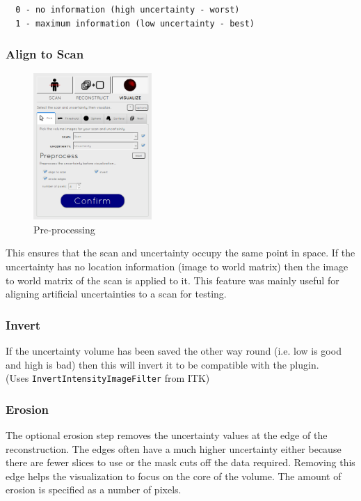 \begin{verbatim}
  0 - no information (high uncertainty - worst)
  1 - maximum information (low uncertainty - best)
\end{verbatim}

\subsubsection*{Align to Scan}
\begin{figure}
  \vspace{-20pt}
  \includegraphics[width=0.4\textwidth]{images/pre-processing.png}
  \caption{Pre-processing}\label{fig:pre-processing_settings}
\end{figure}

This ensures that the scan and uncertainty occupy the same point in space. If the uncertainty has no location information (image to world matrix) then the image to world matrix of the scan is applied to it. This feature was mainly useful for aligning artificial uncertainties to a scan for testing.

\subsubsection*{Invert}
If the uncertainty volume has been saved the other way round (i.e. low is good and high is bad) then this will invert it to be compatible with the plugin.\\(Uses \texttt{InvertIntensityImageFilter} from ITK)

\subsubsection*{Erosion}
The optional erosion step removes the uncertainty values at the edge of the reconstruction. The edges often have a much higher uncertainty either because there are fewer slices to use or the mask cuts off the data required. Removing this edge helps the visualization to focus on the core of the volume. The amount of erosion is specified as a number of pixels.

